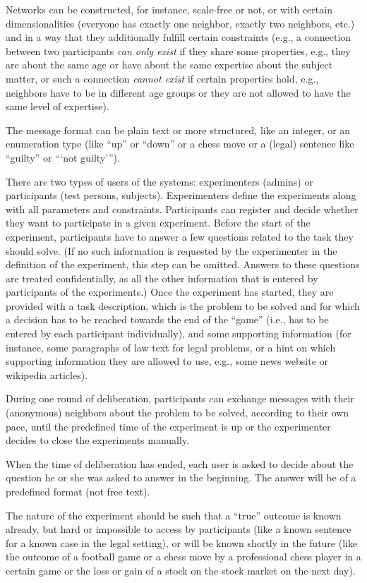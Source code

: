 \documentclass[a4paper, 10pt]{scrreprt}
\begin{document}
Networks can be constructed, for instance, scale-free or not, or with certain dimensionalities (everyone has exactly one neighbor, exactly two neighbors, etc.) and in a way that they additionally fulfill certain constraints (e.g., a connection between two participants {\em can only exist} if they share some properties, e.g., they are about the same age or have about the same expertise about the subject matter, or such a connection {\em cannot exist} if certain properties hold, e.g., neighbors have to be in different age groups or they are not allowed to have the same level of expertise).

The message format can be plain text or more structured, like an integer, or an enumeration type (like ``up'' or ``down'' or a chess move or a (legal) sentence like ``guilty'' or ```not guilty''').

There are two types of users of the systems: experimenters (admins) or participants (test persons, subjects). Experimenters define the experiments along with all parameters and constraints. Participants can register and decide whether they want to participate in a given experiment. Before the start of the experiment, participants have to answer a few questions related to the task they should solve. (If no such information is requested by the experimenter in the definition of the experiment, this step can be omitted. Answers to these questions are treated confidentially, as all the other information that is entered by participants of the experiments.) Once the experiment has started, they are provided with a task description, which is the problem to be solved and for which a decision has to be reached towards the end of the ``game'' (i.e., has to be entered by each participant individually), and some supporting information (for instance, some paragraphs of law text for legal problems, or a hint on which supporting information they are allowed to use, e.g., some news website or wikipedia articles).

During one round of deliberation, participants can exchange messages with their (anonymous) neighbors about the problem to be solved, according to their own pace, until the predefined time of the experiment is up or the experimenter decides to close the experiments manually. 

When the time of deliberation has ended, each user is asked to decide about the question he or she was asked to answer in the beginning. The answer will be of a predefined format (not free text).

The nature of the experiment should be such that a ``true'' outcome is known already, but hard or impossible to access by participants (like a known sentence for a known case in the legal setting), or will be known shortly in the future (like the outcome of a football game or a chess move by a professional chess player in a certain game or the loss or gain of a stock on the stock market on the next day).
\end{document}
